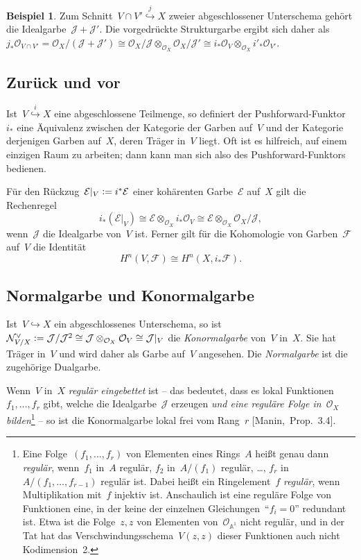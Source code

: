 \documentclass[a4paper,ngerman,12pt]{scrartcl}
\theoremstyle{definition}
\newtheorem{ex}[defn]{Beispiel}
\theoremstyle{plain}
\theoremstyle{remark}
\renewcommand{\AA}{\mathbb{A}}
\newcommand{\E}{\mathcal{E}}
\newcommand{\F}{\mathcal{F}}
\newcommand{\N}{\mathcal{N}}
\newcommand{\J}{\mathcal{J}}
\renewcommand{\O}{\mathcal{O}}
\newcommand{\defeq}{\vcentcolon=}
\begin{document}
\begin{ex}Zum Schnitt~$V \cap V' \stackrel{j}{\hookrightarrow} X$ zweier
abgeschlossener Unterschema gehört die Idealgarbe~$\J + \J'$. Die vorgedrückte
Strukturgarbe ergibt sich daher als~$j_*\O_{V \cap V'} = \O_X/(\J + \J') \cong
\O_X/\J \otimes_{\O_X} \O_X/\J' \cong i_*\O_V \otimes_{\O_X}
i'_*\O_{V'}$.\end{ex}


\subsection*{Zurück und vor}

Ist~$V \stackrel{i}{\hookrightarrow} X$ eine abgeschlossene Teilmenge, so
definiert der Pushforward-Funktor~$i_*$ eine Äquivalenz zwischen der Kategorie
der Garben auf~$V$ und der Kategorie derjenigen Garben auf~$X$, deren Träger
in~$V$ liegt. Oft ist es hilfreich, auf einem einzigen Raum zu arbeiten; dann
kann man sich also des Pushforward-Funktors bedienen.

Für den Rückzug~$\E|_V \defeq i^* \E$ einer kohärenten Garbe~$\E$ auf~$X$ gilt die
Rechenregel
\[ i_* (\E|_V) \cong \E \otimes_{\O_X} i_*\O_V \cong \E \otimes_{\O_X} \O_X/\J,
\]
wenn~$\J$ die Idealgarbe von~$V$ ist. Ferner gilt für die Kohomologie von
Garben~$\F$ auf~$V$ die Identität
\[ H^n(V, \F) \cong H^n(X, i_*\F). \]


\subsection*{Normalgarbe und Konormalgarbe}

Ist~$V \hookrightarrow X$ ein abgeschlossenes Unterschema, so ist~$\N_{V/X}^\vee
\defeq \J/\J^2 \cong \J \otimes_{\O_X} \O_V \cong \J|_V$ die \emph{Konormalgarbe} von~$V$ in~$X$. Sie hat Träger in~$V$ und
wird daher als Garbe auf~$V$ angesehen. Die \emph{Normalgarbe} ist die
zugehörige Dualgarbe.

Wenn~$V$ in~$X$ \emph{regulär eingebettet} ist -- das bedeutet, dass es lokal
Funktionen~$f_1,\ldots,f_r$ gibt, welche die Idealgarbe~$\J$ erzeugen \emph{und
eine reguläre Folge in~$\O_X$ bilden}\footnote{\label{fn:regulaere-folge}Eine Folge~$(f_1,\ldots,f_r)$
von Elementen eines Rings~$A$ heißt genau dann \emph{regulär}, wenn~$f_1$
in~$A$ regulär, $f_2$ in~$A/(f_1)$ regulär, \ldots, $f_r$
in~$A/(f_1,\ldots,f_{r-1})$ regulär ist. Dabei heißt ein Ringelement~$f$
\emph{regulär}, wenn Multiplikation mit~$f$ injektiv ist. Anschaulich ist eine
reguläre Folge von Funktionen eine, in der keine der einzelnen Gleichungen~"`$f_i = 0$"'
redundant ist. Etwa ist die Folge~$z, z$ von Elementen von~$\O_{\AA^1}$ nicht
regulär, und in der Tat hat das Verschwindungsschema~$V(z,z)$ dieser Funktionen
auch nicht Kodimension~2.} -- so ist die Konormalgarbe lokal frei
vom Rang~$r$ [Manin,~Prop.~3.4].
\end{document}
